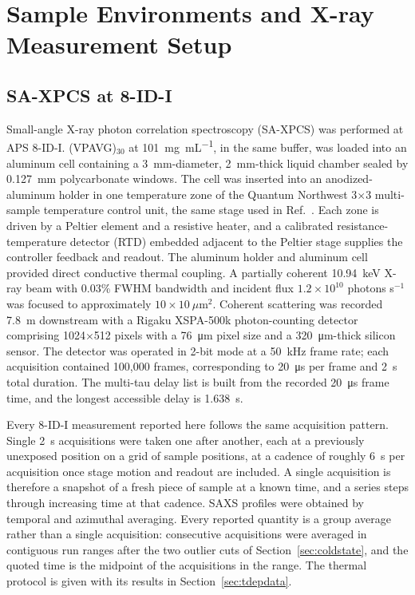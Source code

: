 \documentclass[11pt]{article}
\newcommand{\VPAVG}{(VPAVG)$_{30}$}
\begin{document}
\section{Sample Environments and X-ray Measurement Setup}
\label{sec:setup}

\subsection{SA-XPCS at 8-ID-I}
\label{sec:isoxpcs}
Small-angle X-ray photon correlation spectroscopy (SA-XPCS) was performed at APS 8-ID-I. \VPAVG{} at \SI{101}{\milli\gram\per\milli\liter}, in the same buffer, was loaded into an aluminum cell containing a \SI{3}{\milli\meter}-diameter, \SI{2}{\milli\meter}-thick liquid chamber sealed by \SI{0.127}{\milli\meter} polycarbonate windows. The cell was inserted into an anodized-aluminum holder in one temperature zone of the Quantum Northwest 3$\times$3 multi-sample temperature control unit, the same stage used in Ref.~. Each zone is driven by a Peltier element and a resistive heater, and a calibrated resistance-temperature detector (RTD) embedded adjacent to the Peltier stage supplies the controller feedback and readout. The aluminum holder and aluminum cell provided direct conductive thermal coupling. A partially coherent \SI{10.94}{\kilo\electronvolt} X-ray beam with 0.03\% FWHM bandwidth and incident flux $1.2\times10^{10}$ photons s$^{-1}$ was focused to approximately $10\times10~\mu\mathrm{m}^{2}$. Coherent scattering was recorded \SI{7.8}{\meter} downstream with a Rigaku XSPA-500k photon-counting detector comprising 1024$\times$512 pixels with a \SI{76}{\micro\meter} pixel size and a \SI{320}{\micro\meter}-thick silicon sensor. The detector was operated in 2-bit mode at a \SI{50}{\kilo\hertz} frame rate; each acquisition contained 100,000 frames, corresponding to \SI{20}{\micro\second} per frame and \SI{2}{\second} total duration. The multi-tau delay list is built from the recorded \SI{20}{\micro\second} frame time, and the longest accessible delay is \SI{1.638}{\second}.\cite{Zhang2021-jl}

Every 8-ID-I measurement reported here follows the same acquisition pattern. Single \SI{2}{\second} acquisitions were taken one after another, each at a previously unexposed position on a grid of sample positions, at a cadence of roughly \SI{6}{\second} per acquisition once stage motion and readout are included. A single acquisition is therefore a snapshot of a fresh piece of sample at a known time, and a series steps through increasing time at that cadence. SAXS profiles were obtained by temporal and azimuthal averaging. Every reported quantity is a group average rather than a single acquisition: consecutive acquisitions were averaged in contiguous run ranges after the two outlier cuts of Section~\ref{sec:coldstate}, and the quoted time is the midpoint of the acquisitions in the range. The thermal protocol is given with its results in Section~\ref{sec:tdepdata}.
\end{document}
